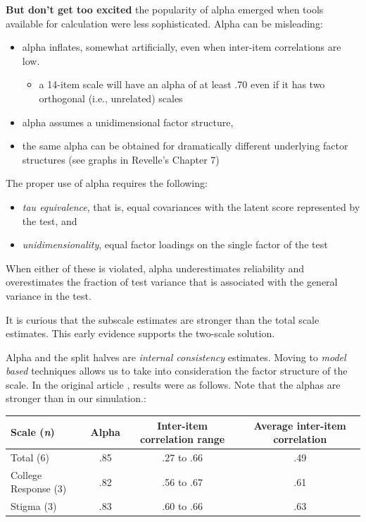 \documentclass[
  english,
]{book}
\providecommand{\tightlist}{%
  \setlength{\itemsep}{0pt}\setlength{\parskip}{0pt}}
\begin{document}
\textbf{But don't get too excited} the popularity of alpha emerged when tools available for calculation were less sophisticated. Alpha can be misleading:

\begin{itemize}
\tightlist
\item
  alpha inflates, somewhat artificially, even when inter-item correlations are low.

  \begin{itemize}
  \tightlist
  \item
    a 14-item scale will have an alpha of at least .70 even if it has two orthogonal (i.e., unrelated) scales \citep{cortina_what_1993}
  \end{itemize}
\item
  alpha assumes a unidimensional factor structure,
\item
  the same alpha can be obtained for dramatically different underlying factor structures (see graphs in Revelle's Chapter 7)
\end{itemize}

The proper use of alpha requires the following:

\begin{itemize}
\tightlist
\item
  \emph{tau equivalence}, that is, equal covariances with the latent score represented by the test, and
\item
  \emph{unidimensionality}, equal factor loadings on the single factor of the test
\end{itemize}

When either of these is violated, alpha underestimates reliability and overestimates the fraction of test variance that is associated with the general variance in the test.

It is curious that the subscale estimates are stronger than the total scale estimates. This early evidence supports the two-scale solution.

Alpha and the split halves are \emph{internal consistency} estimates. Moving to \emph{model based} techniques allows us to take into consideration the factor structure of the scale. In the original article \citep{szymanski_perceptions_2020}, results were as follows. Note that the alphas are stronger than in our simulation.:

\begin{longtable}[]{@{}lccc@{}}
\toprule
Scale (\emph{n}) & Alpha & Inter-item correlation range & Average inter-item correlation \\
\midrule
\endhead
Total (6) & .85 & .27 to .66 & .49 \\
College Response (3) & .82 & .56 to .67 & .61 \\
Stigma (3) & .83 & .60 to .66 & .63 \\
\bottomrule
\end{longtable}
\end{document}
